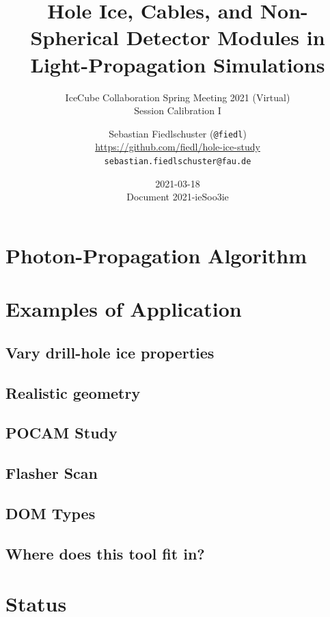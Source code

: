 \documentclass[green, 12pt]{beamer}
\title[Hole Ice, Cables, and Non-Spherical Detector Modules in Light-Propagation Simulations]{Hole Ice, Cables, and Non-Spherical Detector Modules in Light-Propagation Simulations}
\subtitle{IceCube Collaboration Spring Meeting 2021 (Virtual) \\ Session Calibration I}
\date{2021-03-18 \\ \vspace*{2mm}\tiny{Document 2021-ieSoo3ie} \normalsize}
\author[Sebastian Fiedlschuster, ECAP Erlangen, 2021-03-18]{Sebastian Fiedlschuster (\texttt{@fiedl}) \\ \tiny{\url{https://github.com/fiedl/hole-ice-study}} \\ \tiny\texttt{sebastian.fiedlschuster@fau.de}}
\institute{Erlangen Centre for Astroparticle Physics}
\newif\ifplacelogo %
\begin{document}



\placelogofalse

  
  
  
%  

\section{Photon-Propagation Algorithm}
  

\section{Examples of Application}
\subsection{Vary drill-hole ice properties}
  
\subsection{Realistic geometry}
  
\subsection{POCAM Study}
  
\subsection{Flasher Scan}
%  
  
\subsection{DOM Types}
  
\subsection{Where does this tool fit in?}
  

\section{Status}
  
\end{document}
